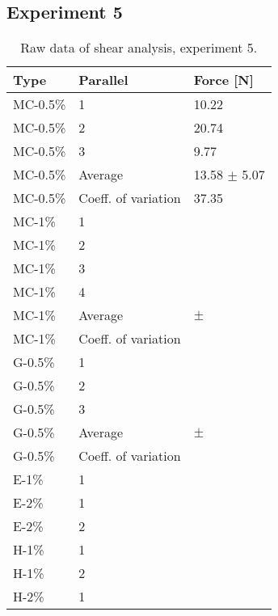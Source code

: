 \subsection{Experiment 5}
\begin{table}[H]
    \caption{Raw data of shear analysis, experiment 5.}
    \centering
    \begin{tabular}{ll|l}
\toprule

\textbf{Type} & \textbf{Parallel}  & \textbf{Force [N]}\\

\hline
MC-0.5\%       &   1       & 10.22\\
MC-0.5\%       &   2       & 20.74 \\
MC-0.5\%       &   3       & 9.77 \\
MC-0.5\%       & Average   & 13.58 $\pm$ 5.07 \\
MC-0.5\%       & Coeff. of variation & 37.35 \\
\hline 
MC-1\%       &   1       &  \\
MC-1\%       &   2       &  \\
MC-1\%       &   3       &  \\
MC-1\%       &   4       &  \\
MC-1\%       & Average   &  $\pm$  \\
MC-1\%       & Coeff. of variation &  \\
\hline
G-0.5\%       &  1       &  \\
G-0.5\%       &  2       &  \\
G-0.5\%       &  3       &  \\
G-0.5\%       & Average   &  $\pm$  \\
G-0.5\%       & Coeff. of variation &  \\
\hline
E-1\%       & 1         &   \\
\hline
E-2\%       & 1         &   \\
E-2\%       & 2         &   \\
\hline
H-1\%       & 1         &   \\
H-1\%       & 2         &   \\
\hline
H-2\%       & 1         &   \\
\bottomrule
    \end{tabular}%
    \label{tab:RawData:ShearForce:Exp5}
\end{table}

